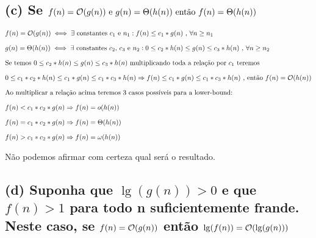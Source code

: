 
\subsection*{(c) Se $f(n) = \mathcal{O}(g(n)) \text{ e } g(n) = \Theta(h(n)) \text{ então } f(n) = \Theta(h(n))$}

\begin{equation*}
  \setlength{\jot}{10pt}
  \begin{aligned}
    &f(n) = \bigO(g(n)) \iff \exists \text{ constantes $c_1$ e $n_1$}: f(n) \leq c_{1}*g(n) \text{ , } \forall n \geq n_1 \\
    &g(n) = \Theta(h(n)) \iff \exists \text{ constantes $c_2$, $c_3$ e $n_2$}: 0 \leq c_{2}*h(n) \leq g(n) \leq c_{3}*h(n) \text{ , } \forall n \geq n_2 \\
    &\text{Se temos } 0 \leq c_{2}*h(n) \leq g(n) \leq c_{3}*h(n) \text{ multiplicando toda a relação por $c_1$ teremos } \\
    &0 \leq c_{1}*c_{2}*h(n) \leq c_{1}*g(n) \leq c_{1}*c_{3}*h(n) \Rightarrow f(n) \leq c_{1}*g(n) \leq c_{1}*c_{3}*h(n) \text{ , então } f(n) = \bigO(h(n)) \\
    &\text{Ao multiplicar a relação acima teremos 3 casos possíveis para a lower-bound: } \\
    &f(n) < c_{1}*c_{2}*g(n) \Rightarrow f(n) = o(h(n)) \\
    &f(n) = c_{1}*c_{2}*g(n) \Rightarrow f(n) = \Theta(h(n)) \\
    &f(n) > c_{1}*c_{2}*g(n) \Rightarrow f(n) = \omega(h(n))
\end{aligned}\end{equation*}

Não podemos afirmar com certeza qual será o resultado.


\subsection*{(d) Suponha que $\lg (g(n)) > 0$ e que $f(n) > 1$ para todo n suficientemente frande. Neste caso, se $f(n) = \mathcal{O}(g(n))$ então $\lg (f(n)) = \mathcal{O}(\lg (g(n)))$}


